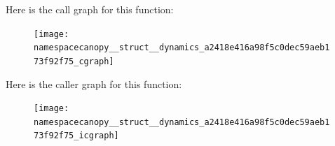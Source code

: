 Here is the call graph for this function\+:
\nopagebreak
\begin{figure}[H]
\begin{center}
\leavevmode
\texttt{[image: namespacecanopy\_\_struct\_\_dynamics\_a2418e416a98f5c0dec59aeb173f92f75\_cgraph]}
\end{center}
\end{figure}
Here is the caller graph for this function\+:
\nopagebreak
\begin{figure}[H]
\begin{center}
\leavevmode
\texttt{[image: namespacecanopy\_\_struct\_\_dynamics\_a2418e416a98f5c0dec59aeb173f92f75\_icgraph]}
\end{center}
\end{figure}
\mbox{\label{namespacecanopy__struct__dynamics_ae0835c779480eba52b24d54c83b952cb}} 

